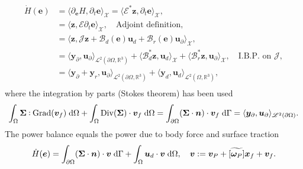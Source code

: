 \documentclass{svjour3}                     %
\DeclareMathOperator*{\Grad}{Grad}
\DeclareMathOperator*{\Div}{Div}
\newcommand{\crmat}[1]{\ensuremath{\widetilde{\left[#1\right]}}}
\def\onedot{$\mathsurround0pt\ldotp$}
\def\cddot{%
	\mathbin{\vcenter{\baselineskip.67ex
			\hbox{\onedot}\hbox{\onedot}}%
}}
\begin{document}
\begin{equation}
\begin{aligned}
\dot{H}(\bm{e}) &= \langle \partial_{\bm{e}} H, \partial_t {\bm{e}} \rangle_{\mathscr{X}} = \langle \bm{\mathcal{E}}^* \bm{z}, \partial_t {\bm{e}} \rangle_{\mathscr{X}}, \\
&= \langle \bm{z}, \bm{\mathcal{E}} \partial_t {\bm{e}} \rangle_{\mathscr{X}}, \quad \text{Adjoint definition}, \\
& = \langle \bm{z}, \bm{\mathcal{J}}\bm{z} + \bm{\mathcal{B}}_d(\bm{e}) \bm{u}_d + \bm{\mathcal{B}}_r(\bm{e}) \bm{u}_\partial \rangle_{\mathscr{X}}, \\
& = \langle \bm{y}_\partial,  \bm{u}_\partial \rangle_{\mathscr{L}^2(\partial\Omega, \mathbb{R}^3)} + \langle \bm{\mathcal{B}}_d^* \bm{z}, \bm{u}_d \rangle_{\mathscr{X}} + \langle \bm{\mathcal{B}}_r^* \bm{z}, \bm{u}_\partial \rangle_{\mathscr{X}}, \quad \text{I.B.P. on } \bm{\mathcal{J}}, \\
&= \langle \bm{y}_\partial + \bm{y}_r,  \bm{u}_\partial \rangle_{\mathscr{L}^2(\partial\Omega, \mathbb{R}^3)} + \langle \bm{y}_d,  \bm{u}_d \rangle_{\mathscr{L}^2(\Omega, \mathbb{R}^3)}, \\
\end{aligned}
\end{equation}
where the integration by parts (Stokes theorem) has been used
\begin{equation}
\label{eq:stokes}
\int_{\Omega} \bm\Sigma \cddot \Grad(\bm{v}_f) \d{\Omega} + \int_{\Omega} \Div(\bm\Sigma) \cdot \bm{v}_f \d{\Omega} = \int_{\partial \Omega} (\bm\Sigma \cdot \bm{n}) \cdot \bm{v}_f \d{\Gamma} = \langle \bm{y}_\partial,  \bm{u}_\partial \rangle_{\mathscr{L}^2(\partial\Omega)}.
\end{equation}
The power balance equals the power due to body force and surface traction
\begin{equation}
\dot{H}(\bm{e}) = \int_{\partial \Omega} (\bm{\Sigma} \cdot \bm{n}) \cdot \bm{v} \d\Gamma + \int_{\Omega} \bm{u}_d \cdot \bm{v}  \d{\Omega}, \quad \bm{v} := \bm{v}_P + \crmat{\bm{\omega}_P} \bm{x}_f + {\bm{v}}_f.
\end{equation}
\end{document}

